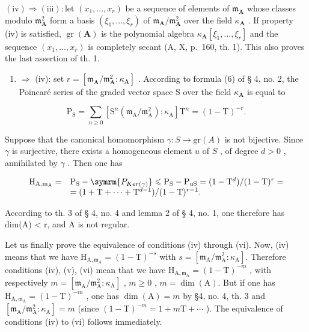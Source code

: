 \((\mathrm{iv}) \Rightarrow (\mathrm{iii}) : \text{let } (x_1, ..., x_r)\) be a sequence of elements of \(\mathfrak{m}_{\mathbf{A}}\) whose classes modulo \(\mathfrak{m}_{\mathbf{A}}^2\) form a basis \((\xi_1, ..., \xi_r)\) of \(\mathfrak{m}_{\mathbf{A}} / \mathfrak{m}_{\mathbf{A}}^2\) over the field \(\kappa_{\mathbf{A}}\) . If property (iv) is satisfied, \(\operatorname{gr}(\mathbf{A})\) is the polynomial algebra \(\kappa_{\mathbf{A}}[\xi_1, ..., \xi_r]\) and the sequence \((x_1, ..., x_r)\) is completely secant (A, X, p.~160, th. 1). This also proves the last assertion of th. 1.

\begin{enumerate}
\def\labelenumi{(\roman{enumi})}
\tightlist
\item
  \(\Rightarrow\) (iv): set \(r = [\mathfrak{m}_{\mathbf{A}} / \mathfrak{m}_{\mathbf{A}}^{2}:\kappa_{\mathbf{A}}]\) . According to formula (6) of § 4, no. 2, the Poincaré series of the graded vector space S over the field \(\kappa_{\mathbf{A}}\) is equal to
\end{enumerate}

\[
\mathrm{P} _ {\mathrm{S}} = \sum_ {n \geqslant 0} \left[ \mathrm{S} ^ {n} (\mathfrak {m} _ {\mathrm{A}} / \mathfrak {m} _ {\mathrm{A}} ^ {2}): \kappa_ {\mathrm{A}} \right] \mathrm{T} ^ {n} = (1 - \mathrm{T}) ^ {- r}.
\]

Suppose that the canonical homomorphism \(\gamma: S \to \mathrm{gr}(A)\) is not bijective. Since \(\gamma\) is surjective, there exists a homogeneous element \(u\) of \(S\) , of degree \(d > 0\) , annihilated by \(\gamma\) . Then one has

\[
\begin{array}{r l} \mathrm {H_ {A,m_ {A}}} = & \mathrm {P_ {S}} - \symrm {P_ {Ker(\gamma)}} \leqslant \mathrm {P_ {S}} - \mathrm {P_ {uS}} = (1 - \mathrm{T} ^ {d}) / (1 - \mathrm{T}) ^ {r} = \\ & = (1 + \mathrm{T} + \dots + \mathrm{T} ^ {d - 1}) / (1 - \mathrm{T}) ^ {r - 1}. \end{array}
\]

According to th. 3 of § 4, no. 4 and lemma 2 of § 4, no. 1, one therefore has dim(A) \textless{} r, and A is not regular.

Let us finally prove the equivalence of conditions (iv) through (vi). Now, (iv) means that we have \(\mathrm{H}_{\mathrm{A},\mathfrak{m}_{\mathrm{A}}}=(1-\mathrm{T})^{-s}\) with \(s=[\mathfrak{m}_{\mathrm{A}}/\mathfrak{m}_{\mathrm{A}}^{2}:\kappa_{\mathrm{A}}]\). Therefore conditions (iv), (v), (vi) mean that we have \(\mathrm{H}_{\mathrm{A},\mathfrak{m}_{\mathrm{A}}}=(1-\mathrm{T})^{-m}\) , with respectively \(m=[\mathfrak{m}_{\mathrm{A}}/\mathfrak{m}_{\mathrm{A}}^{2}:\kappa_{\mathrm{A}}]\) , \(m\geqslant0\) , \(m=\dim(\mathrm{A})\). But if one has \(\mathrm{H}_{\mathrm{A},\mathfrak{m}_{\mathrm{A}}}=(1-\mathrm{T})^{-m}\) , one has \(\dim(\mathrm{A})=m\) by §4, no. 4, th. 3 and \([\mathfrak{m}_{\mathrm{A}}/\mathfrak{m}_{\mathrm{A}}^{2}:\kappa_{\mathrm{A}}]=m\) (since \((1-\mathrm{T})^{-m}=1+m\mathrm{T}+\cdots\) ). The equivalence of conditions (iv) to (vi) follows immediately.

